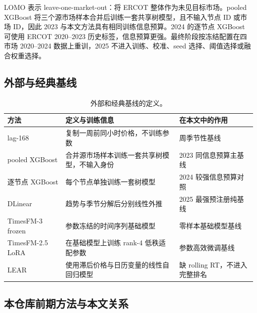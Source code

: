 \documentclass[UTF8,a4paper,11pt,fontset=fandol]{ctexart}
\begin{document}
LOMO 表示 leave-one-market-out：将 ERCOT 整体作为未见目标市场。pooled XGBoost 将三个源市场样本合并后训练一套共享树模型，且不输入节点 ID 或市场 ID，因此 2023 与本文方法具有相同训练信息预算。2024 的逐节点 XGBoost 可使用 ERCOT 2020--2023 历史标签，信息预算更强。最终阶段按冻结配置在四市场 2020--2024 数据上重训，2025 不进入训练、校准、seed 选择、阈值选择或融合权重选择。

\subsection{外部与经典基线}

\begin{table}[H]
\centering
\caption{外部和经典基线的定义。}
\label{tab:baselines}
\footnotesize
\begin{tabularx}{\textwidth}{l Y Y}
\toprule
方法 & 定义与训练信息 & 在本文中的作用 \\
\midrule
lag-168 & 复制一周前同小时价格，不训练参数 & 周季节性基线 \\
pooled XGBoost \cite{chen2016} & 合并源市场样本训练一套共享树模型，不输入身份 & 2023 同信息预算主基线 \\
逐节点 XGBoost \cite{chen2016} & 每个节点单独训练一套树模型 & 2024 较强信息预算对照 \\
DLinear \cite{zeng2023} & 趋势与季节分解后分别线性外推 & 2025 最强预注册纯基线 \\
TimesFM-3 frozen \cite{das2024} & 参数冻结的时间序列基础模型 & 零样本基础模型基线 \\
TimesFM-2.5 LoRA \cite{das2024} & 在基础模型上训练 rank-4 低秩适配参数 & 参数高效微调基线 \\
LEAR & 使用滞后价格与日历变量的线性自回归模型 & 缺 rolling RT，不进入完整排名 \\
\bottomrule
\end{tabularx}
\end{table}

\subsection{本仓库前期方法与本文关系}
\end{document}
